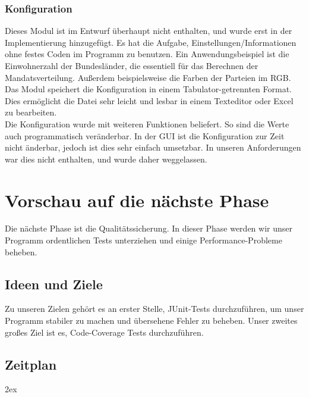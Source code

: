 \documentclass[12pt,a4paper,titlepage]{article}
\begin{document}
\subsubsection{Konfiguration}
Dieses Modul ist im Entwurf überhaupt nicht enthalten, und wurde erst in der Implementierung hinzugefügt. Es hat die Aufgabe, Einstellungen/Informationen ohne festes Coden im Programm zu benutzen. Ein Anwendungsbeispiel ist die Einwohnerzahl der Bundesländer, die essentiell für das Berechnen der Mandatsverteilung. Außerdem beispielsweise die Farben der Parteien im RGB. \\
Das Modul speichert die Konfiguration in einem Tabulator-getrennten Format. Dies ermöglicht die Datei sehr leicht und lesbar in einem Texteditor oder Excel zu bearbeiten. \\
Die Konfiguration wurde mit weiteren Funktionen beliefert. So sind die Werte auch programmatisch veränderbar. In der GUI ist die Konfiguration zur Zeit nicht änderbar, jedoch ist dies sehr einfach umsetzbar. In unseren Anforderungen war dies nicht enthalten, und wurde daher weggelassen.

\section{Vorschau auf die nächste Phase}
Die nächste Phase ist die Qualitätssicherung. In dieser Phase werden wir unser Programm ordentlichen Tests unterziehen und einige Performance-Probleme beheben.
	\subsection{Ideen und Ziele}
Zu unseren Zielen gehört es an erster Stelle, JUnit-Tests durchzuführen, um unser Programm stabiler zu machen und übersehene Fehler zu beheben. Unser zweites großes Ziel ist es, Code-Coverage Tests durchzuführen.
	\subsection{Zeitplan}


\begingroup
\parindent 0pt
\parskip 2ex
\def\enotesize{\normalsize}

\endgroup
\end{document}

